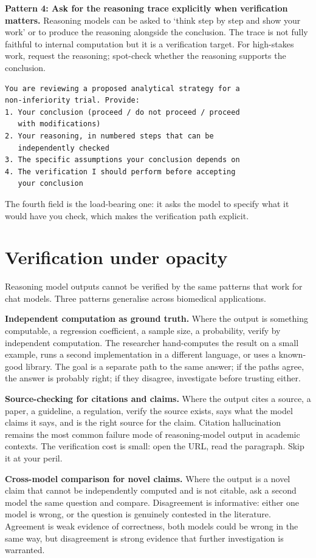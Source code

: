 \documentclass[
  letterpaper,
  11pt]{scrbook}
\begin{document}
\textbf{Pattern 4: Ask for the reasoning trace explicitly when
verification matters.} Reasoning models can be asked to `think step by
step and show your work' or to produce the reasoning alongside the
conclusion. The trace is not fully faithful to internal computation but
it is a verification target. For high-stakes work, request the
reasoning; spot-check whether the reasoning supports the conclusion.

\begin{verbatim}
You are reviewing a proposed analytical strategy for a
non-inferiority trial. Provide:
1. Your conclusion (proceed / do not proceed / proceed
   with modifications)
2. Your reasoning, in numbered steps that can be
   independently checked
3. The specific assumptions your conclusion depends on
4. The verification I should perform before accepting
   your conclusion
\end{verbatim}

The fourth field is the load-bearing one: it asks the model to specify
what it would have you check, which makes the verification path
explicit.

\section{Verification under opacity}\label{verification-under-opacity}

Reasoning model outputs cannot be verified by the same patterns that
work for chat models. Three patterns generalise across biomedical
applications.

\textbf{Independent computation as ground truth.} Where the output is
something computable, a regression coefficient, a sample size, a
probability, verify by independent computation. The researcher
hand-computes the result on a small example, runs a second
implementation in a different language, or uses a known-good library.
The goal is a separate path to the same answer; if the paths agree, the
answer is probably right; if they disagree, investigate before trusting
either.

\textbf{Source-checking for citations and claims.} Where the output
cites a source, a paper, a guideline, a regulation, verify the source
exists, says what the model claims it says, and is the right source for
the claim. Citation hallucination remains the most common failure mode
of reasoning-model output in academic contexts. The verification cost is
small: open the URL, read the paragraph. Skip it at your peril.

\textbf{Cross-model comparison for novel claims.} Where the output is a
novel claim that cannot be independently computed and is not citable,
ask a second model the same question and compare. Disagreement is
informative: either one model is wrong, or the question is genuinely
contested in the literature. Agreement is weak evidence of correctness,
both models could be wrong in the same way, but disagreement is strong
evidence that further investigation is warranted.
\end{document}
